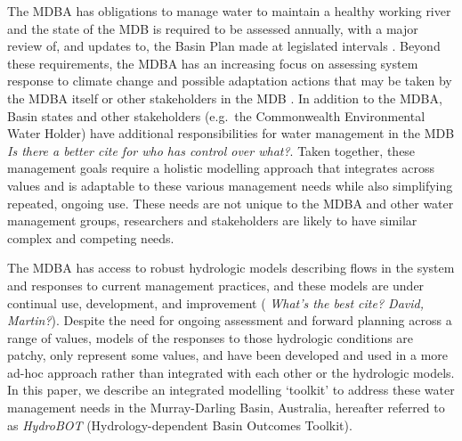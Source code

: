 \documentclass[
  number]{elsarticle}
\begin{document}
The MDBA has obligations to manage water to maintain a healthy working
river and the state of the MDB is required to be assessed annually, with
a major review of, and updates to, the Basin Plan made at legislated
intervals \citep[e.g.~15 years between development and first
review,][]{hart2021}. Beyond these requirements, the MDBA has an
increasing focus on assessing system response to climate change and
possible adaptation actions that may be taken by the MDBA itself or
other stakeholders in the MDB \citep{neave2015}. In addition to the
MDBA, Basin states and other stakeholders (e.g.~the Commonwealth
Environmental Water Holder) have additional responsibilities for water
management in the MDB \citep{hart2021} \emph{Is there a better cite for
who has control over what?}. Taken together, these management goals
require a holistic modelling approach that integrates across values and
is adaptable to these various management needs while also simplifying
repeated, ongoing use. These needs are not unique to the MDBA and other
water management groups, researchers and stakeholders are likely to have
similar complex and competing needs.

The MDBA has access to robust hydrologic models describing flows in the
system and responses to current management practices, and these models
are under continual use, development, and improvement ( \emph{What's the
best cite? David, Martin?}). Despite the need for ongoing assessment and
forward planning across a range of values, models of the responses to
those hydrologic conditions are patchy, only represent some values, and
have been developed and used in a more ad-hoc approach rather than
integrated with each other or the hydrologic models. In this paper, we
describe an integrated modelling `toolkit' to address these water
management needs in the Murray-Darling Basin, Australia, hereafter
referred to as \emph{HydroBOT} (Hydrology-dependent Basin Outcomes
Toolkit).
\end{document}
